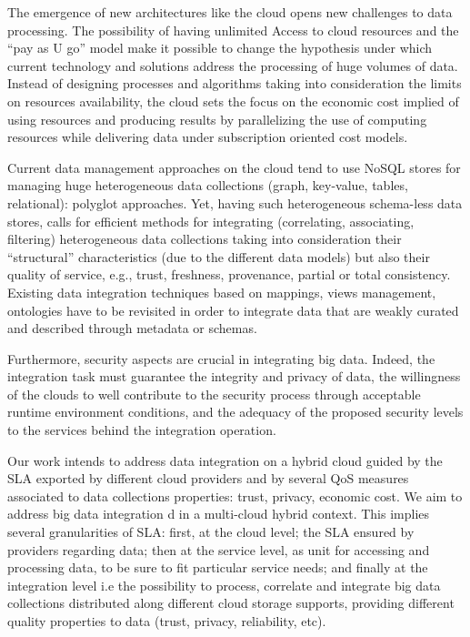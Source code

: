 The emergence of new architectures like the cloud opens new challenges to data processing. 
The possibility of having unlimited Access to cloud resources and the ``pay as U go'' model make it possible to change the hypothesis under which current technology and solutions address the processing of huge volumes of data. 
Instead of designing processes and algorithms taking into consideration the limits on resources availability, the cloud sets the focus on the economic cost implied of using resources and producing results by parallelizing the use of computing resources while delivering data under subscription oriented cost models.
 
Current data management approaches on the cloud tend to use NoSQL stores for managing huge heterogeneous data collections (graph, key-value, tables, relational): polyglot approaches. 
Yet, having such heterogeneous schema-less data stores, calls for efficient methods for integrating (correlating, associating, filtering) heterogeneous data collections taking into consideration their ``structural'' characteristics (due to the different data models) but also their quality of service, e.g., trust, freshness, provenance, partial or total consistency. 
Existing data integration techniques based on mappings, views management, ontologies have to be revisited in order to integrate data that are weakly curated and described through metadata or schemas.

{\color{green} 
Furthermore, security aspects are crucial in integrating big data. Indeed, the integration task must guarantee the integrity and privacy of data, the willingness of the clouds to well contribute to the security process through acceptable runtime environment conditions, and the adequacy of the proposed security levels to the services behind the integration operation.
}
 
Our work intends to address data integration on a hybrid cloud guided by the SLA exported by different cloud providers and by several QoS measures associated to data collections properties: trust, privacy, economic cost. 
We aim to address big data integration d in a multi-cloud hybrid context. 
This implies several granularities of SLA: first, at the cloud level; the SLA ensured by providers regarding data; then at the service level, as unit for accessing and processing data, to be sure to fit particular service needs; and finally at the integration level i.e the possibility to process, correlate and integrate big data collections distributed along different cloud storage supports, providing different quality properties to data (trust, privacy, reliability, etc).
  
